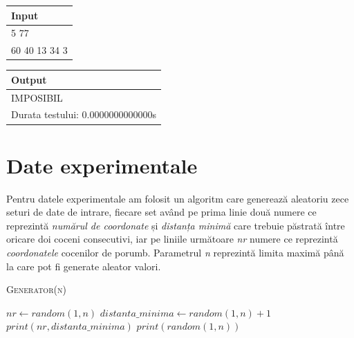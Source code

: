\documentclass[11pt,a4paper]{article}
\begin{document}
\setlength{\arrayrulewidth}{0.7mm}
\setlength{\tabcolsep}{5pt}
\renewcommand{\arraystretch}{1}

\begin{table}[h!]
\centering
\begin{tabular}{ |p{13cm}|  }
\hline
\rowcolor{orange} \textbf{Input} \\
\hline
\rowcolor{LightCyan} 5 77 \\
\rowcolor{LightCyan} 60 40 13 34 3  \\
\hline
\end{tabular}
\end{table}
   
\vspace*{-\baselineskip}

\setlength{\arrayrulewidth}{0.7mm}
\setlength{\tabcolsep}{5pt}
\renewcommand{\arraystretch}{1}

\begin{table}[h!]
\centering

\begin{tabular}{ |p{13cm}|  }
\hline
\rowcolor{orange} \textbf{Output} \\
\hline
\rowcolor{LightCyan} IMPOSIBIL \\ 
\rowcolor{LightCyan}  Durata testului: 0.0000000000000s \\
\hline
\end{tabular}
\end{table} 
  
\section{Date experimentale}

    Pentru datele experimentale am folosit un algoritm care generează aleatoriu zece seturi de date de intrare, fiecare set având pe prima linie două numere ce reprezintă \emph{numărul de coordonate} și \emph{distanța minimă} care trebuie păstrată între oricare doi coceni consecutivi, iar pe liniile următoare \emph{nr} numere ce reprezintă \emph{coordonatele} cocenilor de porumb.  Parametrul \emph{n} reprezintă limita maximă până la care pot fi generate aleator valori.
    
\begin{algorithm}
\caption*{\textsc{Generator(n)}}
\begin{algorithmic}[1]
  \State $nr \leftarrow random(1,n)$
  \State $distanta\_minima \leftarrow random(1,n)+1$
  \State $print(nr, distanta\_minima)$
    \State $print(random(1,n))$
    \EndFor
\EndFor
\end{algorithmic}
\end{algorithm}    
    
\end{document}
